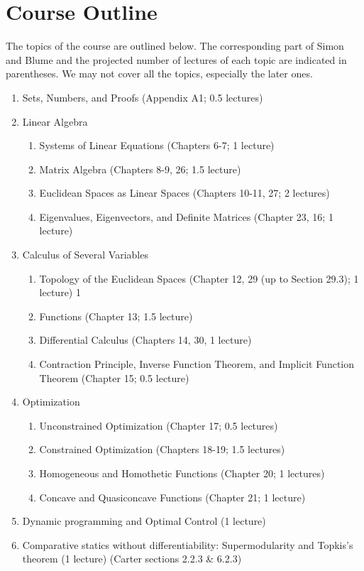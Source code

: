 \documentclass[10pt]{article}
\begin{document}
\section{Course Outline}

The topics of the course are outlined below. The corresponding part of
Simon and Blume and the projected number of lectures of each topic are
indicated in parentheses. We may not cover all the topics, especially
the later ones. 
\begin{enumerate}
\item Sets, Numbers, and Proofs (Appendix A1; 0.5 lectures)
\item Linear Algebra
  \begin{enumerate}
  \item Systems of Linear Equations (Chapters 6-7; 1 lecture)
  \item Matrix Algebra (Chapters 8-9, 26; 1.5 lecture)
  \item Euclidean Spaces as Linear Spaces (Chapters 10-11, 27; 2
    lectures)
  \item Eigenvalues, Eigenvectors, and Definite Matrices (Chapter 23,
    16; 1 lecture)
  \end{enumerate}
\item Calculus of Several Variables
  \begin{enumerate}
  \item Topology of the Euclidean Spaces (Chapter 12, 29 (up to
    Section 29.3); 1 lecture) 1 
  \item Functions (Chapter 13; 1.5 lecture)
  \item Differential Calculus (Chapters 14, 30, 1 lecture)
  \item Contraction Principle, Inverse Function Theorem, and Implicit
    Function Theorem (Chapter 15; 0.5 lecture)
  \end{enumerate}
\item Optimization
  \begin{enumerate}
  \item Unconstrained Optimization (Chapter 17; 0.5 lectures)
  \item Constrained Optimization (Chapters 18-19; 1.5 lectures)
  \item Homogeneous and Homothetic Functions (Chapter 20; 1 lectures)
  \item Concave and Quasiconcave Functions (Chapter 21; 1 lecture)
  \end{enumerate}
\item Dynamic programming and Optimal Control (1 lecture) 
\item Comparative statics without differentiability: Supermodularity
  and Topkis's theorem (1 lecture) (Carter sections 2.2.3 \& 6.2.3)
\end{enumerate}
\end{document}
